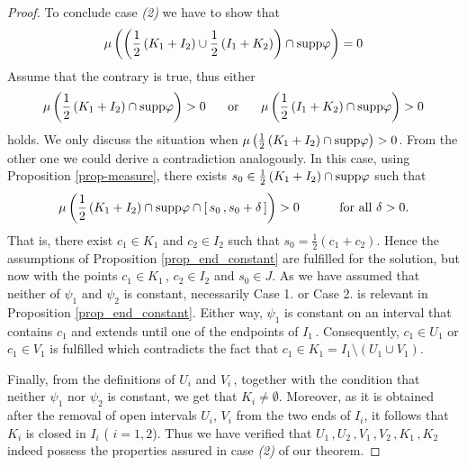 \documentclass[12pt]{amsart}
\theoremstyle{remark}
\theoremstyle{definition}
\newcommand{\supp}{\mbox{\rm supp}}
\begin{document}
\begin{proof}
To conclude case \emph{(2)} 
we have to show that 
\[
\mu \left( \left( 
\frac{1}{2} \left( K_1 + I_2 \right) \cup 
\frac{1}{2} \left( I_1 + K_2 \right) \right)
\cap \supp  \varphi \right) = 0 
\]
Assume that the contrary is true, thus either 
\[ 
\mu \left( 
\frac{1}{2} \left( K_1 + I_2 \right) \cap 
\supp \varphi \right) > 0 
\hspace{5mm} \mbox{ or } \hspace{5mm} 
\mu \left( 
\frac{1}{2} \left( I_1 + K_2 \right) \cap 
\supp \varphi \right) > 0 
\]
holds. We only discuss the situation when 
$ \mu \left( 
\frac{1}{2} \left( K_1 + I_2 \right) \cap 
\supp \varphi \right) > 0 $. 
From the other one we could derive a contradiction analogously. 
In this case, using 
Proposition \ref{prop-measure}, there exists 
$ s_0 \in \frac{1}{2} \left( K_1 + I_2 \right) 
\cap \supp \varphi $ 
such that 
\[
\mu \left( 
\frac{1}{2} \left( K_1 + I_2 \right) 
\cap \supp \varphi \cap 
\left[ \, s_0 \,, s_0 + \delta \, \right] \right) > 0 
\hspace{10 mm} 
\mbox{ for all } \delta > 0. 
\]
That is, there exist 
$ c_1 \in K_1 $ and $ c_2 \in I_2 $ such that 
$ s_0 = \frac{1}{2} \left( c_1 + c_2 \right) $. 
Hence the assumptions of Proposition \ref{prop_end_constant} 
are fulfilled for the solution, but 
now with the points 
$ c_1 \in K_1 \,$, $ c_2 \in I_2 $ and $ s_0 \in J $. 
As we have assumed that neither of 
$ \psi_1 $ and $ \psi_2 $ is constant, 
necessarily Case 1. or Case 2. is relevant 
in Proposition \ref{prop_end_constant}. 
Either way, $ \psi_1 $ is constant on 
an interval that contains $ c_1 $ and 
extends until one of the endpoints of $ I_1 \,$. 
Consequently, 
$ c_1 \in U_1 $ or $ c_1 \in V_1 $ is fulfilled 
which contradicts the fact that 
$ c_1 \in K_1 = 
I_1 \setminus \left( U_1 \cup V_1 \right) $. 

Finally, from the definitions of $ U_i $ and $ V_i \,$, 
together with the condition that neither 
$ \psi_1 $ nor $ \psi_2 $ is constant, 
we get that $ K_i \neq \emptyset $. 
Moreover, as it is obtained after the 
removal of open intervals 
$ U_i $, $ V_i $ from the two ends of 
$ I_i $, it follows that 
$ K_i $ is closed in $ I_i $ ( $ i=1,2 $). 
Thus we have verified that 
$ U_1 \,, U_2 \,, V_1 \,, V_2 \,, K_1 \,, K_2 $ 
indeed possess the properties 
assured in case \emph{(2)} of our theorem. 


\end{proof}
\end{document}
